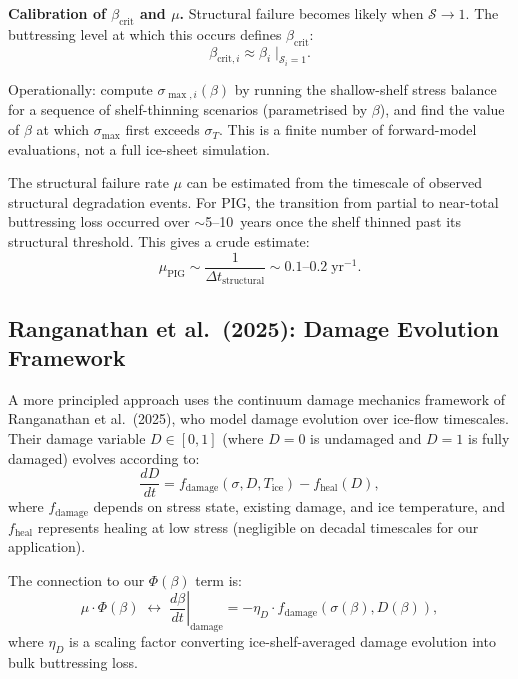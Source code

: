 \documentclass[11pt]{article}
\theoremstyle{definition}
\begin{document}
\textbf{Calibration of $\beta_{\text{crit}}$ and $\mu$.}  Structural failure becomes likely when $\mathcal{S} \to 1$.  The buttressing level at which this occurs defines $\beta_{\text{crit}}$:
\begin{equation}
  \beta_{\text{crit},i} \approx \beta_i \;\Big|_{\mathcal{S}_i = 1}.
  \label{eq:betacrit_calibration}
\end{equation}

Operationally: compute $\sigma_{\max,i}(\beta)$ by running the shallow-shelf stress balance for a sequence of shelf-thinning scenarios (parametrised by $\beta$), and find the value of $\beta$ at which $\sigma_{\max}$ first exceeds $\sigma_{T}$.  This is a finite number of forward-model evaluations, not a full ice-sheet simulation.

The structural failure rate $\mu$ can be estimated from the timescale of observed structural degradation events.  For PIG, the transition from partial to near-total buttressing loss occurred over $\sim$5--10~years once the shelf thinned past its structural threshold.  This gives a crude estimate:
\begin{equation}
  \mu_\text{PIG} \sim \frac{1}{\Delta t_{\text{structural}}} \sim 0.1\text{--}0.2 \;\text{yr}^{-1}.
  \label{eq:mu_crude}
\end{equation}

\subsection{Ranganathan et al.\ (2025): Damage Evolution Framework}
\label{sec:ranganathan_damage}

A more principled approach uses the continuum damage mechanics framework of Ranganathan et al.\ (2025), who model damage evolution over ice-flow timescales.  Their damage variable $D \in [0,1]$ (where $D = 0$ is undamaged and $D = 1$ is fully damaged) evolves according to:
\begin{equation}
  \frac{dD}{dt} = f_{\text{damage}}(\sigma, D, T_{\text{ice}}) - f_{\text{heal}}(D),
  \label{eq:ranganathan_damage}
\end{equation}
where $f_{\text{damage}}$ depends on stress state, existing damage, and ice temperature, and $f_{\text{heal}}$ represents healing at low stress (negligible on decadal timescales for our application).

The connection to our $\Phi(\beta)$ term is:
\begin{equation}
  \mu \cdot \Phi(\beta) \;\longleftrightarrow\; \left.\frac{d\beta}{dt}\right|_{\text{damage}} = -\eta_D \cdot f_{\text{damage}}(\sigma(\beta), D(\beta)),
  \label{eq:damage_bridge}
\end{equation}
where $\eta_D$ is a scaling factor converting ice-shelf-averaged damage evolution into bulk buttressing loss.
\end{document}
